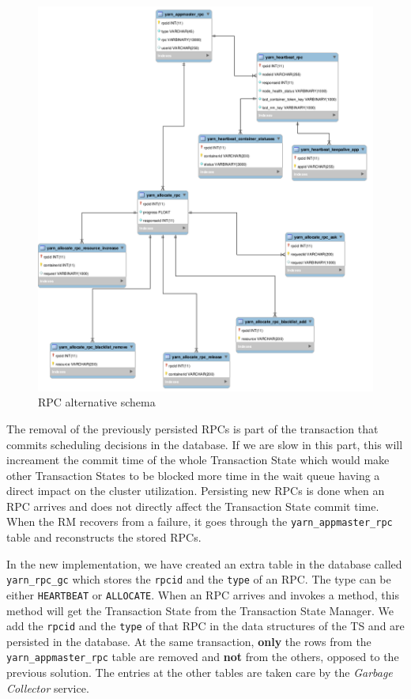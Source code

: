 \begin{figure}
\centering
\includegraphics[scale=0.3]{resources/images/Implementation/rpc_fk_alternate_schema.png}
\caption{RPC alternative schema}
\label{fig:impl_fk_alternate_schema}
\end{figure}

The removal of the previously persisted RPCs is part of the
transaction that commits scheduling decisions in the database. If we
are slow in this part, this will increament the commit time of the
whole Transaction State which would make other Transaction States to
be blocked more time in the wait queue having a direct impact on the
cluster utilization. Persisting new RPCs is done when an RPC arrives
and does not directly affect the Transaction State commit time. When
the RM recovers from a failure, it goes through the
\texttt{yarn\_appmaster\_rpc} table and reconstructs the stored RPCs.

In the new implementation, we have created an extra table in the
database called \texttt{yarn\_rpc\_gc} which stores the \texttt{rpcid}
and the \texttt{type} of an RPC. The type can be either
\texttt{HEARTBEAT} or \texttt{ALLOCATE}. When an RPC arrives and
invokes a method, this method will get the Transaction State from the
Transaction State Manager. We add the \texttt{rpcid} and the
\texttt{type} of that RPC in the data structures of the TS and are
persisted in the database. At the same transaction, \textbf{only} the rows from
the \texttt{yarn\_appmaster\_rpc} table are removed and \textbf{not}
from the others, opposed to the previous solution. The entries at the other tables are taken care by the
\emph{Garbage Collector} service.

